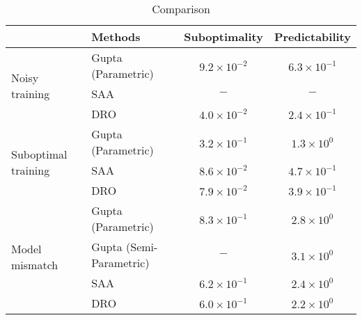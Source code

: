 \documentclass{article}
\begin{document}
\begin{table}
\centering 
\caption{Comparison} 
\begin{tabular}{llcc}\hline 
 &  Methods & Suboptimality & Predictability \\ \hline\multirow{3}{*}{Noisy training } &  Gupta (Parametric)& $9.2\times 10^{-2}$ & $6.3\times 10^{-1}$ \\ 
 & SAA & $-$ & $-$ \\ 
 & DRO & $4.0\times 10^{-2}$ & $2.4\times 10^{-1}$ \\ \hline 
\multirow{3}{*}{Suboptimal training } & Gupta (Parametric)& $3.2\times 10^{-1}$ & $1.3\times 10^{0}$ \\ 
 & SAA & $8.6\times 10^{-2}$ & $4.7\times 10^{-1}$ \\ 
 & DRO & $7.9\times 10^{-2}$ & $3.9\times 10^{-1}$ \\ \hline 
\multirow{4}{*}{Model mismatch } & Gupta (Parametric)& $8.3\times 10^{-1}$ & $2.8\times 10^{0}$ \\ 
 & Gupta (Semi-Parametric) & $-$ & $3.1\times 10^{0}$ \\ 
 & SAA & $6.2\times 10^{-1}$ & $2.4\times 10^{0}$ \\ 
 & DRO & $6.0\times 10^{-1}$ & $2.2\times 10^{0}$ \\ \hline 
\end{tabular} 
\end{table}
\end{document}
